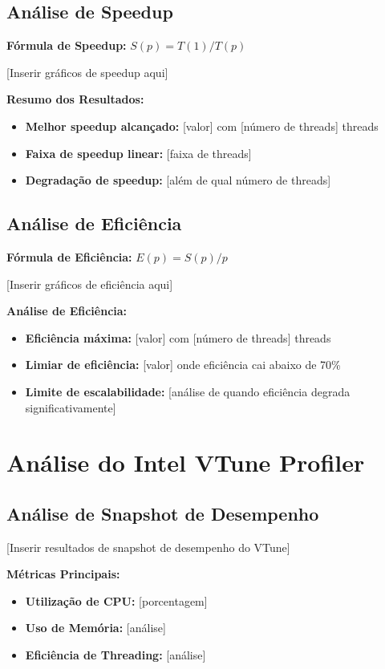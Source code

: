 \documentclass[a4paper,11pt]{article}
\begin{document}
\subsection{Análise de Speedup}

\textbf{Fórmula de Speedup:} $S(p) = T(1) / T(p)$

[Inserir gráficos de speedup aqui]

\textbf{Resumo dos Resultados:}
\begin{itemize}
    \item \textbf{Melhor speedup alcançado:} [valor] com [número de threads] threads
    \item \textbf{Faixa de speedup linear:} [faixa de threads]
    \item \textbf{Degradação de speedup:} [além de qual número de threads]
\end{itemize}

\subsection{Análise de Eficiência}

\textbf{Fórmula de Eficiência:} $E(p) = S(p) / p$

[Inserir gráficos de eficiência aqui]

\textbf{Análise de Eficiência:}
\begin{itemize}
    \item \textbf{Eficiência máxima:} [valor] com [número de threads] threads
    \item \textbf{Limiar de eficiência:} [valor] onde eficiência cai abaixo de 70\%
    \item \textbf{Limite de escalabilidade:} [análise de quando eficiência degrada significativamente]
\end{itemize}

\section{Análise do Intel VTune Profiler}

\subsection{Análise de Snapshot de Desempenho}

[Inserir resultados de snapshot de desempenho do VTune]

\textbf{Métricas Principais:}
\begin{itemize}
    \item \textbf{Utilização de CPU:} [porcentagem]
    \item \textbf{Uso de Memória:} [análise]
    \item \textbf{Eficiência de Threading:} [análise]
\end{itemize}
\end{document}
